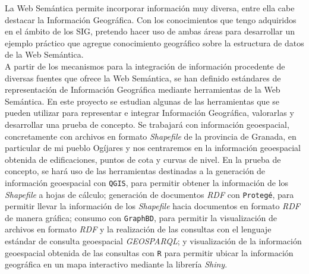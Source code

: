 


La Web Semántica permite incorporar información muy diversa, entre ella cabe destacar la Información Geográfica. Con los conocimientos que tengo adquiridos en el ámbito de los SIG, pretendo hacer uso de ambas áreas para desarrollar un ejemplo práctico que agregue conocimiento geográfico sobre la estructura de datos de la Web Semántica. \\ %

A partir de los mecanismos para la integración de información procedente de diversas fuentes que ofrece la Web Semántica, se han definido estándares de representación de Información Geográfica mediante herramientas de la Web Semántica. En este proyecto se estudian algunas de las herramientas que se pueden utilizar para representar e integrar Información Geográfica, valorarlas y desarrollar una prueba de concepto. Se trabajará con información geoespacial, concretamente con archivos en formato \textit{Shapefile} de la provincia de Granada, en particular de mi pueblo Ogíjares y nos centraremos en la información geoespacial obtenida de edificaciones, puntos de cota y curvas de nivel. En la prueba de concepto, se hará uso de las herramientas destinadas a la generación de información geoespacial con \texttt{QGIS}, para permitir obtener la información de los \textit{Shapefile} a hojas de cálculo; generación de documentos \textit{RDF} con \texttt{Protegé}, para permitir llevar la información de los \textit{Shapefile} hacia documentos en formato \textit{RDF} de manera gráfica; consumo con \texttt{GraphBD},  para permitir la visualización de archivos en formato \textit{RDF} y la realización de las consultas con el lenguaje estándar de consulta geoespacial \textit{GEOSPARQL}; y visualización de la información geoespacial obtenida de las consultas con \texttt{R} para permitir ubicar la información geográfica en un mapa interactivo mediante la librería \textit{Shiny}.


